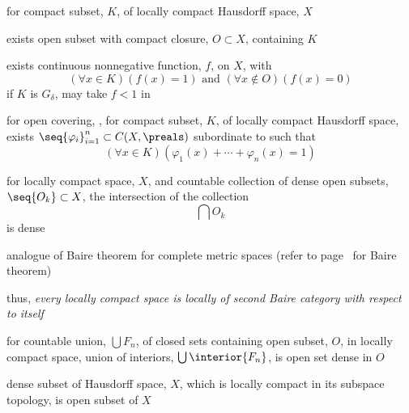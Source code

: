 \documentclass[17pt,landscape]{foils}
\begin{document}
{{%
%

\bit
	\item for compact subset, $K$, of locally compact Hausdorff space, $X$\
	\bit
		\item exists open subset with compact closure, $O\subset X$, containing $K$

		\item exists continuous nonnegative function, $f$, on $X$,
		with
		\[
			(\forall x\in K)(f(x)=1) \mbox{ and } (\forall x\not\in O)(f(x)=0)
		\]
		if $K$ is $G_\delta$, may take $f<1$ in \
	\eit

	\vitem for open covering, , for compact subset, $K$, of locally compact Hausdorff space,
		exists $\seq{\varphi_i}_{i=1}^n \subset C(X,\preals)$ subordinate to 
		such that
		\[
			(\forall x \in K)(\varphi_1(x)+\cdots+\varphi_n(x) =1)
		\]
\eit


%
%

\bit
	\item
		for locally compact space, $X$,
		and countable collection of dense open subsets, $\seq{O_k}\subset X$,
		the intersection of the collection
		\[
			\bigcap O_k
		\]
		is dense

	\bit
		\item analogue of Baire theorem for complete metric spaces
			(refer to page~\pageref{page:Baire-theorem} for Baire theorem)
	\eit

	\vitem thus, \emph{every locally compact space is locally of second Baire category with respect to itself}
\eit


%

\bit
	\item for countable union, $\bigcup F_n$, of closed sets containing open subset, $O$, in locally compact space,
		union of interiors, $\bigcup \interior{F_n}$, is
		open set dense in $O$

	\vitem dense subset of Hausdorff space, $X$, which is locally compact in its subspace topology,
		is open subset of $X$

}}
\end{document}
